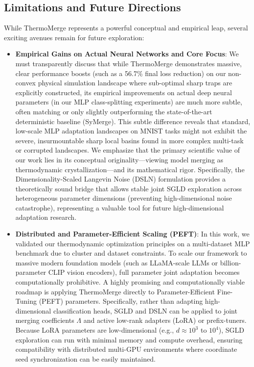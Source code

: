 \subsection{Limitations and Future Directions}
While ThermoMerge represents a powerful conceptual and empirical leap, several exciting avenues remain for future exploration:
\begin{itemize}
\item \textbf{Empirical Gains on Actual Neural Networks and Core Focus}: We must transparently discuss that while ThermoMerge demonstrates massive, clear performance boosts (such as a 56.7\% final loss reduction) on our non-convex physical simulation landscape where sub-optimal sharp traps are explicitly constructed, its empirical improvements on actual deep neural parameters (in our MLP class-splitting experiments) are much more subtle, often matching or only slightly outperforming the state-of-the-art deterministic baseline (SyMerge).
This subtle difference reveals that standard, low-scale MLP adaptation landscapes on MNIST tasks might not exhibit the severe, insurmountable sharp local basins found in more complex multi-task or corrupted landscapes.
We emphasize that the primary scientific value of our work lies in its conceptual originality---viewing model merging as thermodynamic crystallization---and its mathematical rigor.
Specifically, the Dimensionality-Scaled Langevin Noise (DSLN) formulation provides a theoretically sound bridge that allows stable joint SGLD exploration across heterogeneous parameter dimensions (preventing high-dimensional noise catastrophe), representing a valuable tool for future high-dimensional adaptation research.
\item \textbf{Distributed and Parameter-Efficient Scaling (PEFT)}: In this work, we validated our thermodynamic optimization principles on a multi-dataset MLP benchmark due to cluster and dataset constraints.
To scale our framework to massive modern foundation models (such as LLaMA-scale LLMs or billion-parameter CLIP vision encoders), full parameter joint adaptation becomes computationally prohibitive.
A highly promising and computationally viable roadmap is applying ThermoMerge directly to Parameter-Efficient Fine-Tuning (PEFT) parameters.
Specifically, rather than adapting high-dimensional classification heads, SGLD and DSLN can be applied to joint merging coefficients $\Lambda$ and active low-rank adapters (LoRA) or prefix-tuners.
Because LoRA parameters are low-dimensional (e.g., $d \approx 10^3$ to $10^4$), SGLD exploration can run with minimal memory and compute overhead, ensuring compatibility with distributed multi-GPU environments where coordinate seed synchronization can be easily maintained.

\end{itemize}

